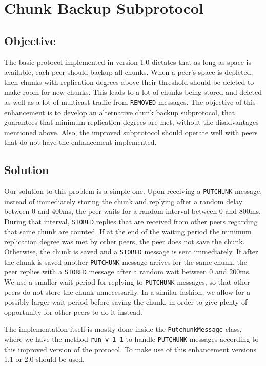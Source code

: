 \documentclass[11pt,a4paper,reqno]{report}
\numberwithin{equation}{section}
\begin{document}




\chapter{Chunk Backup Subprotocol}

\section{Objective}

The basic protocol implemented in version 1.0 dictates that as long as space is available, each peer should backup all chunks. When a peer's space is depleted, then chunks with replication degrees above their threshold should be deleted to make room for new chunks. This leads to a lot of chunks being stored and deleted as well as a lot of multicast traffic from \verb!REMOVED! messages. The objective of this enhancement is to develop an alternative chunk backup subprotocol, that guarantees that minimum replication degrees are met, without the disadvantages mentioned above. Also, the improved subprotocol should operate well with peers that do not have the enhancement implemented.

\section{Solution}

Our solution to this problem is a simple one. Upon receiving a \verb!PUTCHUNK! message, instead of immediately storing the chunk and replying after a random delay between 0 and 400ms, the peer waits for a random interval between 0 and 800ms. During that interval, \verb!STORED! replies that are received from other peers regarding that same chunk are counted. If at the end of the waiting period the minimum replication degree was met by other peers, the peer does not save the chunk. Otherwise, the chunk is saved and a \verb!STORED! message is sent immediately. If after the chunk is saved another \verb!PUTCHUNK! message arrives for the same chunk, the peer replies with a \verb!STORED! message after a random wait between 0 and 200ms. We use a smaller wait period for replying to \verb!PUTCHUNK! messages, so that other peers do not store the chunk unnecessarily. In a similar fashion, we allow for a possibly larger wait period before saving the chunk, in order to give plenty of opportunity for other peers to do it instead.

The implementation itself is mostly done inside the \verb!PutchunkMessage! class, where we have the method \verb!run_v_1_1! to handle \verb!PUTCHUNK! messages according to this improved version of the protocol. To make use of this enhancement versions 1.1 or 2.0 should be used.
\end{document}
